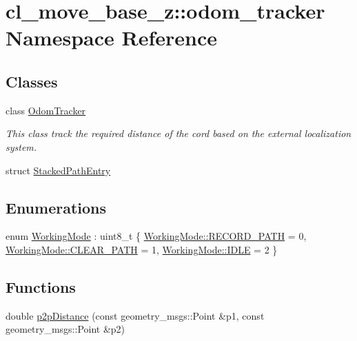 \hypertarget{namespacecl__move__base__z_1_1odom__tracker}{}\section{cl\+\_\+move\+\_\+base\+\_\+z\+:\+:odom\+\_\+tracker Namespace Reference}
\label{namespacecl__move__base__z_1_1odom__tracker}
\subsection*{Classes}
\begin{DoxyCompactItemize}
\item 
class \hyperlink{classcl__move__base__z_1_1odom__tracker_1_1OdomTracker}{Odom\+Tracker}
\begin{DoxyCompactList}\small\item\em This class track the required distance of the cord based on the external localization system. \end{DoxyCompactList}\item 
struct \hyperlink{structcl__move__base__z_1_1odom__tracker_1_1StackedPathEntry}{Stacked\+Path\+Entry}
\end{DoxyCompactItemize}
\subsection*{Enumerations}
\begin{DoxyCompactItemize}
\item 
enum \hyperlink{namespacecl__move__base__z_1_1odom__tracker_ac46b05813b2791604f6cd0a39ace3ef8}{Working\+Mode} \+: uint8\+\_\+t \{ \hyperlink{namespacecl__move__base__z_1_1odom__tracker_ac46b05813b2791604f6cd0a39ace3ef8a023bc3adf68871ef7a0c616765ac80a7}{Working\+Mode\+::\+R\+E\+C\+O\+R\+D\+\_\+\+P\+A\+TH} = 0, 
\hyperlink{namespacecl__move__base__z_1_1odom__tracker_ac46b05813b2791604f6cd0a39ace3ef8a68783989ae56d7f2f9496c66c417a192}{Working\+Mode\+::\+C\+L\+E\+A\+R\+\_\+\+P\+A\+TH} = 1, 
\hyperlink{namespacecl__move__base__z_1_1odom__tracker_ac46b05813b2791604f6cd0a39ace3ef8aa5daf7f2ebbba4975d61dab1c40188c7}{Working\+Mode\+::\+I\+D\+LE} = 2
 \}
\end{DoxyCompactItemize}
\subsection*{Functions}
\begin{DoxyCompactItemize}
\item 
double \hyperlink{namespacecl__move__base__z_1_1odom__tracker_a501582a760a02ce0069d95bfc67ca973}{p2p\+Distance} (const geometry\+\_\+msgs\+::\+Point \&p1, const geometry\+\_\+msgs\+::\+Point \&p2)
\end{DoxyCompactItemize}


